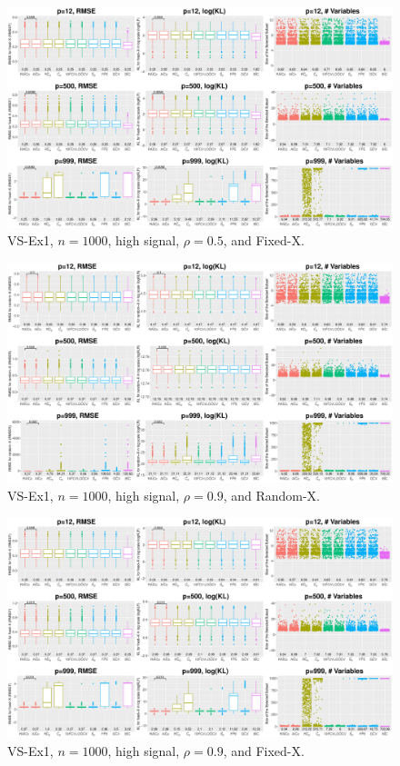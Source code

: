 \begin{figure}[!ht]
\centering
\includegraphics[width=\textwidth]{figures/supplement/fixedx_VS-Ex1_n1000_hsnr_rho05.eps}
\caption{VS-Ex1, $n=1000$, high signal, $\rho=0.5$, and Fixed-X.}
\end{figure}
\clearpage
\begin{figure}[!ht]
\centering
\includegraphics[width=\textwidth]{figures/supplement/randomx_VS-Ex1_n1000_hsnr_rho09.eps}
\caption{VS-Ex1, $n=1000$, high signal, $\rho=0.9$, and Random-X.}
\end{figure}
\begin{figure}[!ht]
\centering
\includegraphics[width=\textwidth]{figures/supplement/fixedx_VS-Ex1_n1000_hsnr_rho09.eps}
\caption{VS-Ex1, $n=1000$, high signal, $\rho=0.9$, and Fixed-X.}
\end{figure}
